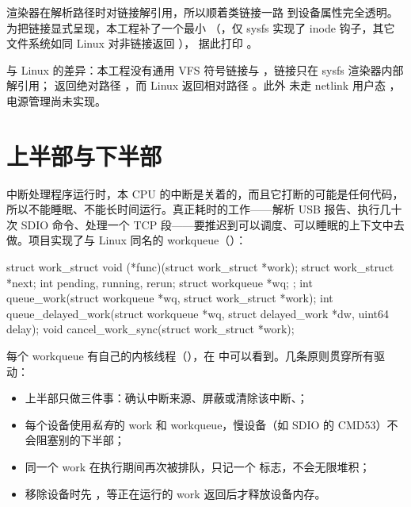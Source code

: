 渲染器在解析路径时对链接解引用，所以顺着类链接一路  到设备属性完全透明。为把链接显式呈现，本工程补了一个最小 （，仅 sysfs 实现了  inode 钩子，其它文件系统如同 Linux 对非链接返回 ）， 据此打印 。

\begin{note}
与 Linux 的差异：本工程没有通用 VFS 符号链接与 ，链接只在 sysfs 渲染器内部解引用； 返回绝对路径 ，而 Linux 返回相对路径 。此外  未走 netlink 用户态 ， 电源管理尚未实现。
\end{note}

\section{上半部与下半部}

中断处理程序运行时，本 CPU 的中断是关着的，而且它打断的可能是任何代码，所以不能睡眠、不能长时间运行。真正耗时的工作——解析 USB 报告、执行几十次 SDIO 命令、处理一个 TCP 段——要推迟到可以调度、可以睡眠的上下文中去做。项目实现了与 Linux 同名的 workqueue（）：

\begin{ccode}
struct work_struct {
  void (*func)(struct work_struct *work);
  struct work_struct *next;
  int pending, running, rerun;
  struct workqueue *wq;
};
int  queue_work(struct workqueue *wq, struct work_struct *work);
int  queue_delayed_work(struct workqueue *wq, struct delayed_work *dw, uint64 delay);
void cancel_work_sync(struct work_struct *work);
\end{ccode}

每个 workqueue 有自己的内核线程（），在  中可以看到。几条原则贯穿所有驱动：

\begin{itemize}
  \item 上半部只做三件事：确认中断来源、屏蔽或清除该中断、；
  \item 每个设备使用\emph{私有}的 work 和 workqueue，慢设备（如 SDIO 的 CMD53）不会阻塞别的下半部；
  \item 同一个 work 在执行期间再次被排队，只记一个  标志，不会无限堆积；
  \item 移除设备时先 ，等正在运行的 work 返回后才释放设备内存。
\end{itemize}

